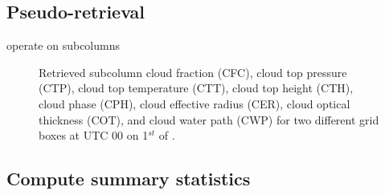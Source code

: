 \subsection{Pseudo-retrieval}
operate on subcolumns


\begin{figure}[!h]
  \begin{minipage}{\textwidth}
  \end{minipage}\vspace*{0.5cm}
  \begin{minipage}{\textwidth}
  \end{minipage}
  \caption[Retrieved subcolumn cloud top parameters.]
{Retrieved subcolumn cloud fraction (CFC), cloud top pressure (CTP),
cloud top temperature (CTT), cloud top height (CTH),
cloud phase (CPH), cloud effective radius (CER),
cloud optical thickness (COT), and cloud water path (CWP) 
for two different grid boxes at UTC 00 on 1$^{st}$ of \MonthYear.}
\label{fig:retrieved}
\end{figure}



\subsection{Compute summary statistics}


%
%


